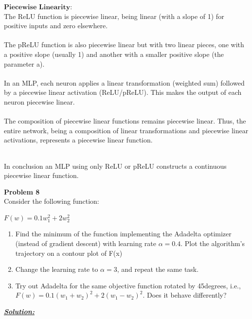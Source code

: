 \documentclass{article}
\begin{document}
\noindent$\bm{Piecewise}$ $ \bm{Linearity:} $\\
The ReLU function is piecewise linear, being linear (with a slope of 1) for positive inputs and zero elsewhere. \\\\
The pReLU function is also piecewise linear but with two linear pieces, one with a positive slope (usually 1) and another with a smaller positive slope (the parameter a). \\\\
In an MLP, each neuron applies a linear transformation (weighted sum) followed by a piecewise linear activation (ReLU/pReLU). This makes the output of each neuron piecewise linear. \\\\
The composition of piecewise linear functions remains piecewise linear. Thus, the entire network, being a composition of linear transformations and piecewise linear activations, represents a piecewise linear function.

\noindent \\In conclusion an MLP using only ReLU or pReLU constructs a continuous piecewise linear function.


\newpage
\noindent \textbf{Problem 8} \\
Consider the following function:
\begin{center}
    $ F(w) = 0.1w_1^2 + 2w_2^2$
\end{center}

\begin{enumerate}
    \item Find the minimum of the function implementing the Adadelta optimizer (instead of
            gradient descent) with learning rate $\alpha = 0.4$. Plot the algorithm’s trajectory on a contour
            plot of F(x)
    \item Change the learning rate to $\alpha = 3$, and repeat the same task.
    \item Try out Adadelta for the same objective function rotated by 45degrees, i.e., 
            $ F(w) = 0.1(w_1+w_2)^2 + 2(w_1-w_2)^2$. Does it behave differently?\\ 
\end{enumerate} 

\noindent \underline{\textbf{\textit{Solution:}}} 
\end{document}
